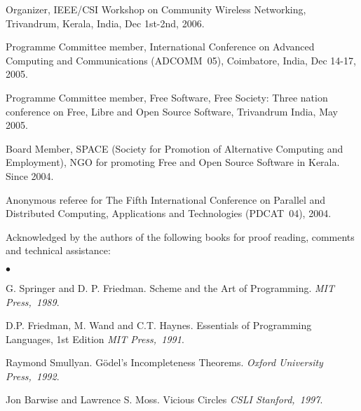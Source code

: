 \documentclass[11pt,margin,line]{res}
\newenvironment{list2}{
  \begin{list}{$\bullet$}{%
      \setlength{\itemsep}{0in}
      \setlength{\parsep}{0in} \setlength{\parskip}{0in}
      \setlength{\topsep}{0in} \setlength{\partopsep}{0in} 
      \setlength{\leftmargin}{0.2in}}}{\end{list}}
\begin{document}
\begin{resume}
Organizer, IEEE/CSI Workshop on Community Wireless
Networking, Trivandrum, Kerala, India, Dec 1st-2nd, 2006.

Programme Committee member, International Conference on
Advanced Computing and Communications (ADCOMM~05),
Coimbatore, India, Dec 14-17, 2005.

Programme Committee member, Free Software, Free Society: Three
nation conference on Free, Libre and Open Source Software,
Trivandrum India, May 2005.

Board Member, SPACE (Society for Promotion of Alternative
Computing and Employment), NGO for promoting Free and Open
Source Software in Kerala. Since 2004.

Anonymous referee for The Fifth International Conference on
Parallel and Distributed Computing, Applications and
Technologies (PDCAT~04), 2004.  

Acknowledged by the authors of the following books for
proof reading, comments  and technical assistance:\\
\begin{list2}
 \item G. Springer and D. P. Friedman.  {Scheme and the Art of
 Programming}.  {\em {MIT Press,~1989}}.
 \item D.P. Friedman, M. Wand and C.T. Haynes.  Essentials of
 Programming Languages, 1st Edition  {\em {MIT Press,~1991}}.
 \item Raymond Smullyan. G\"{o}del's Incompleteness Theorems.
 {\em {Oxford University Press,~1992}}.
 \item Jon Barwise and Lawrence S. Moss. Vicious Circles
 {\em {CSLI Stanford,~1997}}.
\end{list2}






\end{resume}
\end{document}
